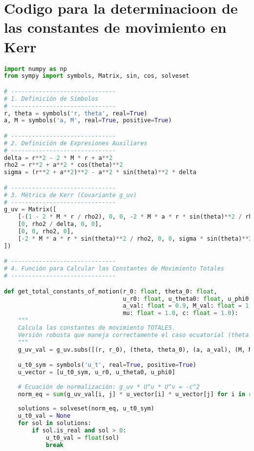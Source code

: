 \section{Codigo para la determinacioon de las constantes de movimiento en Kerr}
\label{chap:programa_constantes_kerr}
\begin{lstlisting}[language=Python, caption={Programa para el calculo de las constantes de movimiento en Kerr}]
import numpy as np
from sympy import symbols, Matrix, sin, cos, solveset

# ------------------------------
# 1. Definición de Símbolos
# ------------------------------
r, theta = symbols('r, theta', real=True)
a, M = symbols('a, M', real=True, positive=True)

# ------------------------------
# 2. Definición de Expresiones Auxiliares
# ------------------------------
delta = r**2 - 2 * M * r + a**2
rho2 = r**2 + a**2 * cos(theta)**2
sigma = (r**2 + a**2)**2 - a**2 * sin(theta)**2 * delta

# ------------------------------
# 3. Métrica de Kerr (Covariante g_uv)
# ------------------------------
g_uv = Matrix([
    [-(1 - 2 * M * r / rho2), 0, 0, -2 * M * a * r * sin(theta)**2 / rho2],
    [0, rho2 / delta, 0, 0],
    [0, 0, rho2, 0],
    [-2 * M * a * r * sin(theta)**2 / rho2, 0, 0, sigma * sin(theta)**2 / rho2]
])

# ------------------------------
# 4. Función para Calcular las Constantes de Movimiento Totales
# ------------------------------

def get_total_constants_of_motion(r_0: float, theta_0: float, 
                                  u_r0: float, u_theta0: float, u_phi0: float, 
                                  a_val: float = 0.9, M_val: float = 1.0,
                                  mu: float = 1.0, c: float = 1.0):
    """
    Calcula las constantes de movimiento TOTALES.
    Versión robusta que maneja correctamente el caso ecuatorial (theta = pi/2).
    """
    g_uv_val = g_uv.subs([(r, r_0), (theta, theta_0), (a, a_val), (M, M_val)])

    u_t0_sym = symbols('u_t', real=True, positive=True)
    u_vector = [u_t0_sym, u_r0, u_theta0, u_phi0]
    
    # Ecuación de normalización: g_uv * U^u * U^v = -c^2
    norm_eq = sum(g_uv_val[i, j] * u_vector[i] * u_vector[j] for i in range(4) for j in range(4)) + c**2
    
    solutions = solveset(norm_eq, u_t0_sym)
    u_t0_val = None
    for sol in solutions:
        if sol.is_real and sol > 0:
            u_t0_val = float(sol)
            break
            

\end{lstlisting}
